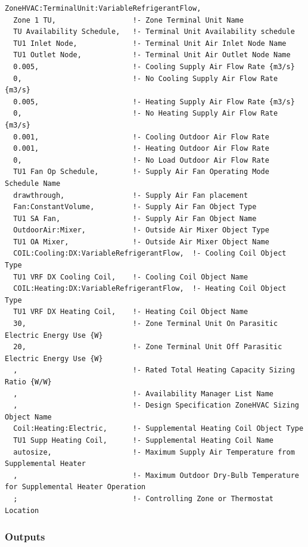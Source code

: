 \begin{lstlisting}
ZoneHVAC:TerminalUnit:VariableRefrigerantFlow,
  Zone 1 TU,                  !- Zone Terminal Unit Name
  TU Availability Schedule,   !- Terminal Unit Availability schedule
  TU1 Inlet Node,             !- Terminal Unit Air Inlet Node Name
  TU1 Outlet Node,            !- Terminal Unit Air Outlet Node Name
  0.005,                      !- Cooling Supply Air Flow Rate {m3/s}
  0,                          !- No Cooling Supply Air Flow Rate {m3/s}
  0.005,                      !- Heating Supply Air Flow Rate {m3/s}
  0,                          !- No Heating Supply Air Flow Rate {m3/s}
  0.001,                      !- Cooling Outdoor Air Flow Rate
  0.001,                      !- Heating Outdoor Air Flow Rate
  0,                          !- No Load Outdoor Air Flow Rate
  TU1 Fan Op Schedule,        !- Supply Air Fan Operating Mode Schedule Name
  drawthrough,                !- Supply Air Fan placement
  Fan:ConstantVolume,         !- Supply Air Fan Object Type
  TU1 SA Fan,                 !- Supply Air Fan Object Name
  OutdoorAir:Mixer,           !- Outside Air Mixer Object Type
  TU1 OA Mixer,               !- Outside Air Mixer Object Name
  COIL:Cooling:DX:VariableRefrigerantFlow,  !- Cooling Coil Object Type
  TU1 VRF DX Cooling Coil,    !- Cooling Coil Object Name
  COIL:Heating:DX:VariableRefrigerantFlow,  !- Heating Coil Object Type
  TU1 VRF DX Heating Coil,    !- Heating Coil Object Name
  30,                         !- Zone Terminal Unit On Parasitic Electric Energy Use {W}
  20,                         !- Zone Terminal Unit Off Parasitic Electric Energy Use {W}
  ,                           !- Rated Total Heating Capacity Sizing Ratio {W/W}
  ,                           !- Availability Manager List Name
  ,                           !- Design Specification ZoneHVAC Sizing Object Name
  Coil:Heating:Electric,      !- Supplemental Heating Coil Object Type
  TU1 Supp Heating Coil,      !- Supplemental Heating Coil Name
  autosize,                   !- Maximum Supply Air Temperature from Supplemental Heater
  ,                           !- Maximum Outdoor Dry-Bulb Temperature for Supplemental Heater Operation
  ;                           !- Controlling Zone or Thermostat Location
\end{lstlisting}

\subsubsection{Outputs}\label{outputs-12-006}


